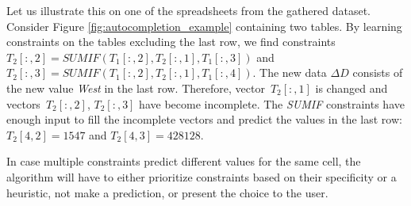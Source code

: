\documentclass{IEEEtran}
\newcommand{\range}[3]{\ensuremath{#1[#2,#3]}}
\newcommand{\rangeall}{:}
\newcommand{\eccalc}[2]{\ensuremath{#1 = #2}}
\newcommand{\ecsumif}[4]{\eccalc{#1}{\textit{SUMIF}(#2, #3, #4)}}
\theoremstyle{definition}
\begin{document}
Let us illustrate this on one of the spreadsheets from the gathered dataset.
Consider Figure \ref{fig:autocompletion_example} containing two tables.
By learning constraints on the tables excluding the last row, we find constraints $\ecsumif{\range{T_2}{\rangeall}{2}}{\range{T_1}{\rangeall}{2}}{\range{T_2}{\rangeall}{1}}{\range{T_1}{\rangeall}{3}}$ and $\ecsumif{\range{T_2}{\rangeall}{3}}{\range{T_1}{\rangeall}{2}}{\range{T_2}{\rangeall}{1}}{\range{T_1}{\rangeall}{4}}$.
The new data $\Delta D$ consists of the new value \textit{West} in the last row.
Therefore, vector~$\range{T_2}{:}{1}$ is changed and vectors~$\range{T_2}{:}{2}$, $\range{T_2}{:}{3}$ have become incomplete.
The \textit{SUMIF} constraints have enough input to fill the incomplete vectors and predict the values in the last row: $\range{T_2}{4}{2} = 1547$ and $\range{T_2}{4}{3} = 428128$.

In case multiple constraints predict different values for the same cell, the algorithm will have to either prioritize constraints based on their specificity or a heuristic, not make a prediction, or present the choice to the user.
\end{document}
